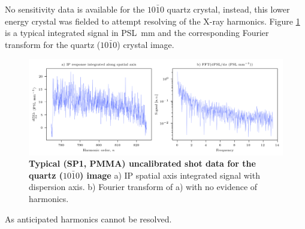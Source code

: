 No sensitivity data is available for the $10\bar{1}0$ quartz crystal, instead, this lower energy crystal was fielded to attempt resolving of the X-ray harmonics. Figure \ref{fig:orionq1010} is a typical integrated signal in \unit{PSL.mm} and the corresponding Fourier transform for the quartz ($10\bar{1}0$) crystal image.
\begin{figure}
	\centering
	\includegraphics[width=1\linewidth]{figures/orion/orion_q1010}
	\caption[Typical ORION experiment uncalibrated IP response quartz ($10\bar{1}0$) crystal and Fourier transform]{\textbf{Typical (SP1, PMMA) uncalibrated shot data for the quartz ($10\bar{1}0$) image} a) IP spatial axis integrated signal with dispersion axis. b) Fourier transform of a) with no evidence of harmonics.}
	\label{fig:orionq1010}
\end{figure}
As anticipated harmonics cannot be resolved.

